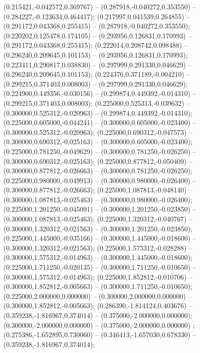  (0.215421,-0.042572,0.369767) -- (0.287918,-0.040272,0.353550) -- (0.284227,-0.123634,0.464417);
 (0.217997,0.041539,0.264855) -- (0.291172,0.043368,0.255415) -- (0.287918,-0.040272,0.353550);
 (0.220202,0.125478,0.174105) -- (0.293956,0.126831,0.170993) -- (0.291172,0.043368,0.255415);
 (0.222014,0.208742,0.098488) -- (0.296240,0.209645,0.101153) -- (0.293956,0.126831,0.170993);
 (0.223411,0.290817,0.038830) -- (0.297999,0.291330,0.046629) -- (0.296240,0.209645,0.101153);
 (0.224376,0.371189,-0.004210) -- (0.299215,0.371403,0.008003) -- (0.297999,0.291330,0.046629);
 (0.224900,0.449356,-0.030156) -- (0.299874,0.449392,-0.014310) -- (0.299215,0.371403,0.008003);
 (0.225000,0.525313,-0.039632) -- (0.300000,0.525312,-0.020963) -- (0.299874,0.449392,-0.014310);
 (0.225000,0.605000,-0.044241) -- (0.300000,0.605000,-0.023400) -- (0.300000,0.525312,-0.020963);
 (0.225000,0.690312,-0.047573) -- (0.300000,0.690312,-0.025163) -- (0.300000,0.605000,-0.023400);
 (0.225000,0.781250,-0.049629) -- (0.300000,0.781250,-0.026250) -- (0.300000,0.690312,-0.025163);
 (0.225000,0.877812,-0.050409) -- (0.300000,0.877812,-0.026663) -- (0.300000,0.781250,-0.026250);
 (0.225000,0.980000,-0.049913) -- (0.300000,0.980000,-0.026400) -- (0.300000,0.877812,-0.026663);
 (0.225000,1.087813,-0.048140) -- (0.300000,1.087813,-0.025463) -- (0.300000,0.980000,-0.026400);
 (0.225000,1.201250,-0.045091) -- (0.300000,1.201250,-0.023850) -- (0.300000,1.087813,-0.025463);
 (0.225000,1.320312,-0.040767) -- (0.300000,1.320312,-0.021563) -- (0.300000,1.201250,-0.023850);
 (0.225000,1.445000,-0.035166) -- (0.300000,1.445000,-0.018600) -- (0.300000,1.320312,-0.021563);
 (0.225000,1.575312,-0.028288) -- (0.300000,1.575312,-0.014963) -- (0.300000,1.445000,-0.018600);
 (0.225000,1.711250,-0.020135) -- (0.300000,1.711250,-0.010650) -- (0.300000,1.575312,-0.014963);
 (0.225000,1.852812,-0.010706) -- (0.300000,1.852812,-0.005663) -- (0.300000,1.711250,-0.010650);
 (0.225000,2.000000,0.000000) -- (0.300000,2.000000,0.000000) -- (0.300000,1.852812,-0.005663);
 (0.286390,-1.814124,0.403676) -- (0.359238,-1.816967,0.374014) -- (0.375000,-2.000000,0.000000);
 (0.300000,-2.000000,0.000000) -- (0.375000,-2.000000,0.000000) ;
 (0.275386,-1.652895,0.730060) -- (0.346413,-1.657030,0.678330) -- (0.359238,-1.816967,0.374014);
